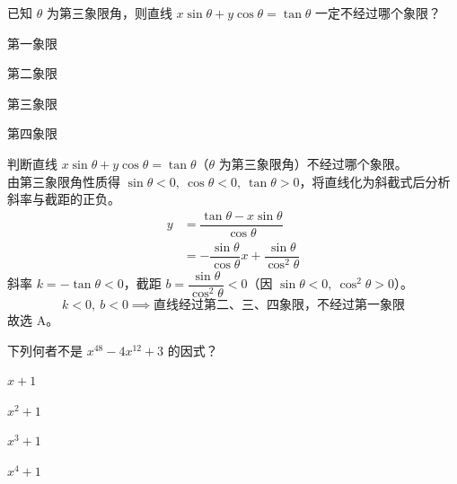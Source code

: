 \documentclass[12pt,a4paper]{exam-zh}
\begin{document}
\newpage
\begin{question}
    已知 $\theta$ 为第三象限角，则直线 $x\sin\theta + y\cos\theta = \tan\theta$ 一定不经过哪个象限？ \paren[A]
    \begin{choices}
        \item 第一象限
        \item 第二象限
        \item 第三象限
        \item 第四象限
    \end{choices}
\end{question}

\begin{solution}
    判断直线 $x\sin\theta+y\cos\theta=\tan\theta$（$\theta$ 为第三象限角）不经过哪个象限。\\
    由第三象限角性质得 $\sin\theta<0,\ \cos\theta<0,\ \tan\theta>0$，将直线化为斜截式后分析斜率与截距的正负。\\
    \begin{align*}
        y &= \dfrac{\tan\theta-x\sin\theta}{\cos\theta} \\
        &= -\dfrac{\sin\theta}{\cos\theta}x+\dfrac{\sin\theta}{\cos^2\theta}
    \end{align*}
    斜率 $k=-\tan\theta<0$，截距 $b=\dfrac{\sin\theta}{\cos^2\theta}<0$（因 $\sin\theta<0,\ \cos^2\theta>0$）。
    \[
        k<0,\ b<0 \implies \text{直线经过第二、三、四象限，不经过第一象限}
    \]
    故选 A。
\end{solution}
\begin{question}
    下列何者不是 $x^{48}-4x^{12}+3$ 的因式？ \paren[D]
    \begin{choices}
        \item $x+1$
        \item $x^{2}+1$
        \item $x^{3}+1$
        \item $x^{4}+1$
    \end{choices}
\end{question}
\end{document}
